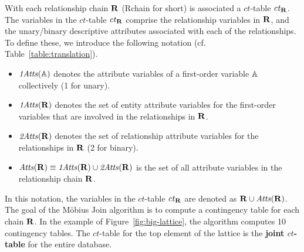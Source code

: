 \documentclass{sig-alternate-2013}
\newcommand{\ct}{\mathit{ct}}
\begin{document}
%
With each relationship chain $\mathbf{R}$ (Rchain for short) is associated a $\ct$-table $\ct_{\set{\Relation}}$. 
The variables in the $\ct$-table  $\ct_{\set{\Relation}}$ %
 comprise the relationship variables  in $\mathbf{R}$, and the unary/binary descriptive attributes associated with each of the relationships. To define these, we introduce the following notation (cf. Table~\ref{table:translation}).

\begin{itemize}
\item  $\it{1Atts}(\mathbb{A})$ denotes the attribute variables of a first-order variable $\mathbb{A}$ collectively (1 for unary).
\item $\it{1Atts}(\mathbf{R})$ denotes the set of entity attribute variables for the first-order variables that are involved in the relationships in $\mathbf{R}$. 
\item $\it{2Atts}(\mathbf{R})$ denotes the set of relationship attribute variables for %
the relationships in $\mathbf{R}$ (2 for binary).
\item $\it{Atts}(\mathbf{R}) \equiv \it{1Atts}(\mathbf{R}) \cup \it{2Atts}(\mathbf{R})$ is the set of all attribute variables in the relationship chain $\mathbf{R}$.

\end{itemize}

In this notation, the variables in the $\ct$-table  $\ct_{\set{\Relation}}$  are denoted as $\mathbf{R} \cup \it{Atts}({\mathbf{R}})$. 
The goal of the M\"obius Join algorithm is to compute a contingency table for each chain $\mathbf{R}$. 
In the example of Figure~\ref{fig:big-lattice}, the algorithm computes 10 contingency tables. The $\ct$-table for the top element of the lattice is the \textbf{joint $\ct$-table} for the entire database. 
\end{document}
